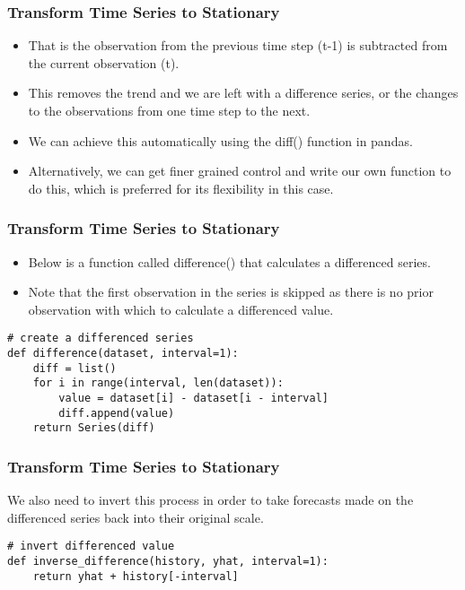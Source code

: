 \begin{frame}[fragile] \frametitle{Transform Time Series to Stationary}
\begin{itemize}
\item That is the observation from the previous time step (t-1) is subtracted from the current observation (t). 
\item This removes the trend and we are left with a difference series, or the changes to the observations from one time step to the next.
\item We can achieve this automatically using the diff() function in pandas.
\item Alternatively, we can get finer grained control and write our own function to do this, which is preferred for its flexibility in this case.
\end{itemize}

\end{frame}

\begin{frame}[fragile] \frametitle{Transform Time Series to Stationary}
\begin{itemize}
\item Below is a function called difference() that calculates a differenced series. 
\item Note that the first observation in the series is skipped as there is no prior observation with which to calculate a differenced value.
\end{itemize}
\begin{lstlisting}
# create a differenced series
def difference(dataset, interval=1):
	diff = list()
	for i in range(interval, len(dataset)):
		value = dataset[i] - dataset[i - interval]
		diff.append(value)
	return Series(diff)
\end{lstlisting}   
\end{frame}

\begin{frame}[fragile] \frametitle{Transform Time Series to Stationary}
We also need to invert this process in order to take forecasts made on the differenced series back into their original scale.
\begin{lstlisting}
# invert differenced value
def inverse_difference(history, yhat, interval=1):
	return yhat + history[-interval]
\end{lstlisting}   

\end{frame}

